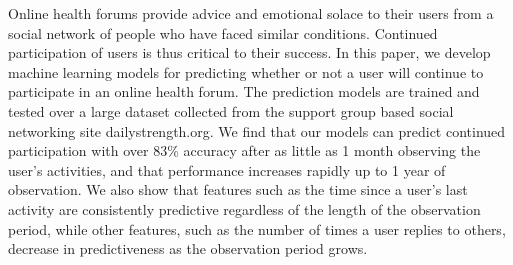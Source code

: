 Online health forums provide advice and emotional solace to their users from a social network of people who have faced similar conditions. Continued participation of users is thus critical to their success. In this paper, we develop machine learning models for predicting whether or not a user will continue to participate in an online health forum. The prediction models are trained and tested over a large dataset collected from the support group based social networking site dailystrength.org. We find that our models can predict continued participation with over 83\% accuracy after as little as 1 month observing the user's activities, and that performance increases rapidly up to 1 year of observation. We also show that features such as the time since a user's last activity are consistently predictive regardless of the length of the observation period, while other features, such as the number of times a user replies to others, decrease in predictiveness as the observation period grows.
